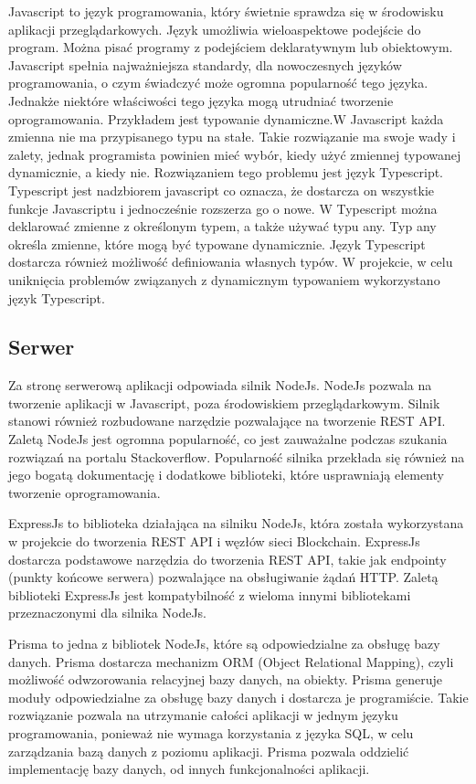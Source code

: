 \documentclass[a4paper,12pt]{book}
\begin{document}
Javascript to język programowania, który świetnie sprawdza się w środowisku aplikacji przeglądarkowych. Język umożliwia wieloaspektowe podejście do program. Można pisać programy z podejściem deklaratywnym lub obiektowym. Javascript spełnia najważniejsza standardy, dla nowoczesnych języków programowania, o czym świadczyć może ogromna popularność tego języka. Jednakże niektóre właściwości tego języka mogą utrudniać tworzenie oprogramowania. Przykładem jest typowanie dynamiczne.W Javascript każda zmienna nie ma przypisanego typu na stałe. Takie rozwiązanie ma swoje wady i zalety, jednak programista powinien mieć wybór, kiedy użyć zmiennej typowanej dynamicznie, a kiedy nie. Rozwiązaniem tego problemu jest język Typescript. Typescript jest nadzbiorem javascript co oznacza, że dostarcza on wszystkie funkcje Javascriptu i jednocześnie rozszerza go o nowe. W Typescript można deklarować zmienne z określonym typem, a także używać typu any. Typ any określa zmienne, które mogą być typowane dynamicznie. Język Typescript dostarcza również możliwość definiowania własnych typów. W projekcie, w celu uniknięcia problemów związanych z dynamicznym typowaniem wykorzystano język Typescript.

\subsection{Serwer}
Za stronę serwerową aplikacji odpowiada silnik NodeJs. NodeJs pozwala na tworzenie aplikacji w Javascript, poza środowiskiem przeglądarkowym. Silnik stanowi również rozbudowane narzędzie pozwalające na tworzenie REST API. Zaletą NodeJs jest ogromna popularność, co jest zauważalne podczas szukania rozwiązań na portalu Stackoverflow. Popularność silnika przekłada się również na jego bogatą dokumentację i dodatkowe biblioteki, które usprawniają elementy tworzenie oprogramowania.

ExpressJs to biblioteka działająca na silniku NodeJs, która została wykorzystana w projekcie do tworzenia REST API i węzłów sieci Blockchain. ExpressJs dostarcza podstawowe narzędzia do tworzenia REST API, takie jak endpointy (punkty końcowe serwera) pozwalające na obsługiwanie żądań HTTP. Zaletą biblioteki ExpressJs jest kompatybilność z wieloma innymi bibliotekami przeznaczonymi dla silnika NodeJs.

Prisma to jedna z bibliotek NodeJs, które są odpowiedzialne za obsługę bazy danych. Prisma dostarcza mechanizm ORM (Object Relational Mapping), czyli możliwość odwzorowania relacyjnej bazy danych, na obiekty. Prisma generuje moduły odpowiedzialne za obsługę bazy danych i dostarcza je programiście. Takie rozwiązanie pozwala na utrzymanie całości aplikacji w jednym języku programowania, ponieważ nie wymaga korzystania z języka SQL, w celu zarządzania bazą danych z poziomu aplikacji. Prisma pozwala oddzielić implementację bazy danych, od innych funkcjonalności aplikacji.
\end{document}
